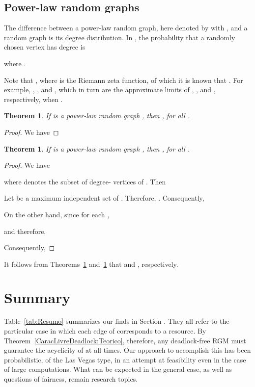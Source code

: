 \documentclass{article}
\newtheorem{thm}[lem]{Theorem}
\begin{document}
\subsection{Power-law random graphs}

The difference between a power-law random graph, here denoted by  with
, and a random graph is its degree distribution. In , the
probability that a randomly chosen vertex  has degree  is

where .

Note that , where  is the
Riemann zeta function, of which it is known that
. For example, ,
, and , which in turn are the
approximate limits of , , and , respectively,
when .

\begin{thm}
\label{EXPna}
If  is a power-law random graph , then
, for all .
\end{thm}

\begin{proof}
We have

\end{proof}

\begin{thm}
\label{PXPna}
If  is a power-law random graph , then
,
for all .
\end{thm}

\begin{proof}
We have

where  denotes the subset of degree- vertices of . Then


Let  be a maximum independent set of . Therefore,
. Consequently,

On the other hand, since  for each , 

and therefore,


Consequently,

\end{proof}

It follows from Theorems~\ref{EXPna} and~\ref{PXPna} that
 and
, respectively.

\section{Summary}

Table~\ref{tab:Resumo} summarizes our finds in Section . They all refer to
the particular case in which each edge of  corresponds to a resource. By
Theorem~\ref{CaracLivreDeadlock:Teorico}, therefore, any deadlock-free RGM must
guarantee the acyclicity of  at all times. Our approach to accomplish this
has been probabilistic, of the Las Vegas type, in an attempt at feasibility even
in the case of large computations. What can be expected in the general case, as
well as questions of fairness, remain research topics.
\end{document}

